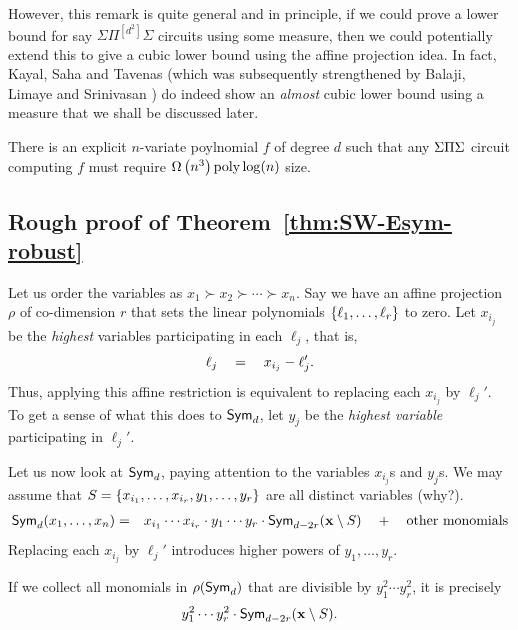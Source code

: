 However, this remark is quite general and in principle, if we could prove a lower bound for say $\Sigma\Pi^{[d^2]}\Sigma$ circuits using some measure, then we could potentially extend this to give a cubic lower bound using the affine projection idea.
In fact, Kayal, Saha and Tavenas \cite{kst16} (which was subsequently strengthened by Balaji, Limaye and Srinivasan \cite{BLS16}) do indeed show an \emph{almost} cubic lower bound using a measure that we shall be discussed later.


\begin{theorem} There is an explicit $n$-variate poylnomial $f$ of degree $d$ such that any $\Sigma\Pi\Sigma$ circuit computing $f$ must require $\Omega\left(n^3\right){\operatorname{poly} \log(n)}$ size. 
\end{theorem}

\subsection{Rough proof of Theorem~\ref{thm:SW-Esym-robust}}

Let us order the variables as $x_1 \succ x_2 \succ \cdots \succ x_n$.
Say we have an affine projection $\rho$ of co-dimension $r$ that sets the linear polynomials $\left\{\ell_1,\ldots, \ell_r\right\}$ to zero. Let $x_{i_j}$ be the \emph{highest} variables participating in each $\ell_j$, that is,
\[
  \ell_j \quad = \quad x_{i_j} - \ell_j'.
\]
Thus, applying this affine restriction is equivalent to replacing each $x_{i_j}$ by $\ell_{j}'$. To get a sense of what this does to $\operatorname{\mathsf{Sym}}_d$, let $y_j$ be the \emph{highest variable} participating in $\ell_j'$.

Let us now look at $\operatorname{\mathsf{Sym}}_d$, paying attention to the variables $x_{i_j}$s and $y_j$s. We may assume that  $S = \left\{x_{i_1},\ldots, x_{i_r}, y_1,\ldots, y_r\right\}$ are all distinct variables (why?).
\begin{eqnarray*}
  \operatorname{\mathsf{Sym}}_d(x_1,\ldots, x_n) & = &  x_{i_1}\cdots x_{i_r}\cdot y_1\cdots y_r \cdot \operatorname{\mathsf{Sym}}_{d - 2r}(\mathbf{x} \setminus S) \quad + \quad \text{other monomials}
\end{eqnarray*}
Replacing each $x_{i_j}$ by $\ell_j'$ introduces higher powers of $y_1,\ldots, y_r$.

\begin{claim}
  If we collect all monomials in $\rho(\operatorname{\mathsf{Sym}}_d)$ that are divisible by $y_1^2\cdots y_r^2$, it is precisely
  \[
    y_1^2 \cdots y_r^2 \cdot \operatorname{\mathsf{Sym}}_{d-2r}(\mathbf{x} \setminus S).
  \]
\end{claim}

